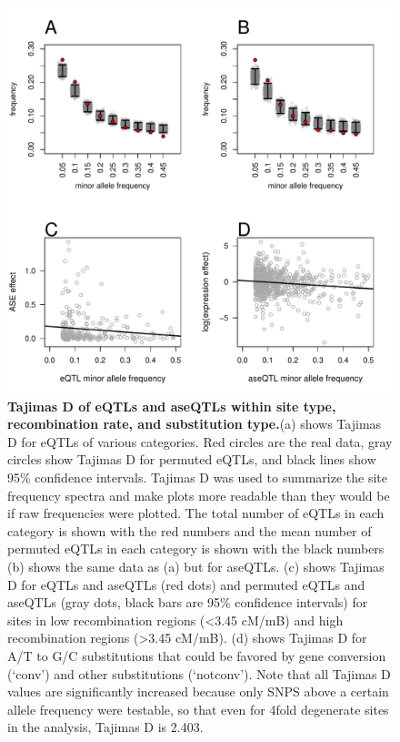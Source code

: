 \begin{figure}[ht]
      \centering
       \includegraphics[width=\linewidth]{Ch3FigS5}
    \caption{\textbf{Tajima\textsc{}s D of eQTLs and aseQTLs within site type, recombination rate, and substitution type.}(a) shows Tajima\textsc{}s D for eQTLs of various categories. Red circles are the real data, gray circles show Tajima\textsc{}s D for permuted eQTLs, and black lines show 95\% confidence intervals. Tajima\textsc{}s D was used to summarize the site frequency spectra and make plots more readable than they would be if raw frequencies were plotted. The total number of eQTLs in each category is shown with the red numbers and the mean number of permuted eQTLs in each category is shown with the black numbers (b) shows the same data as (a) but for aseQTLs. (c) shows Tajima\textsc{}s D for eQTLs and aseQTLs (red dots) and permuted eQTLs and aseQTLs (gray dots, black bars are 95\% confidence intervals) for sites in low recombination regions (\textless 3.45 cM/mB) and high recombination regions (\textgreater 3.45 cM/mB). (d) shows Tajima\textsc{}s D for A/T to G/C substitutions that could be favored by gene conversion (‘conv’) and other substitutions (‘notconv’). Note that all Tajima\textsc{}s D values are significantly increased because only SNPS above a certain allele frequency were testable, so that even for 4\-fold degenerate sites in the analysis, Tajima\textsc{}s D is 2.403.}
    \label{fig:3figS5}
\end{figure}

